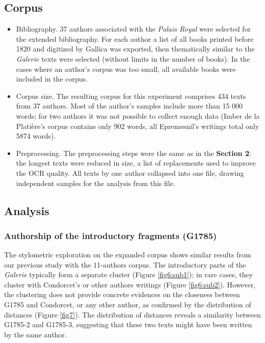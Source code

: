 \documentclass[12pt, letterpaper]{article}
\begin{document}
\subsection{Corpus}
\begin{itemize}
    \item Bibliography. 37 authors\footnotemark[4] associated with the \emph{Palais Royal} were selected for the extended bibliography. For each author a list of all books printed before 1820 and digitized by Gallica was exported, then thematically similar to the \emph{Galerie} texts were selected (without limits in the number of books). In the cases where an author's corpus was too small, all available books were included in the corpus.
    \item Corpus size. The resulting corpus for this experiment comprises 434 texts from 37 authors. Most of the author's samples include more than 15 000 words; for two authors it was not possible to collect enough data (Imber de la Platière's corpus contains only 902 words, all Epremesnil's writings total only 5874 words).
    \item Preprocessing. The preprocessing steps were the same as in the \textbf{Section 2}: the longest texts were reduced in size, a list of replacements used to improve the OCR quality. All texts by one author collapsed into one file, drawing independent samples for the analysis from this file.
    
\end{itemize}

\subsection{Analysis}
\subsubsection{Authorship of the introductory fragments (G1785)}

The stylometric exploration on the expanded corpus shows similar results from our previous study with the 11-authors corpus. The introductory parts of the \emph{Galerie} typically form a separate cluster (Figure \ref{fig6:sub1}); in rare cases, they cluster with Condorcet's or other authors writings (Figure \ref{fig6:sub2}). However, the clustering does not provide concrete evidences on the closeness between G1785 and Condorcet, or any other author, as confirmed by the distribution of distances (Figure \ref{fig7}). The distribution of distances reveals a similarity between G1785-2 and G1785-3, suggesting that these two texts might have been written by the same author.
\end{document}
